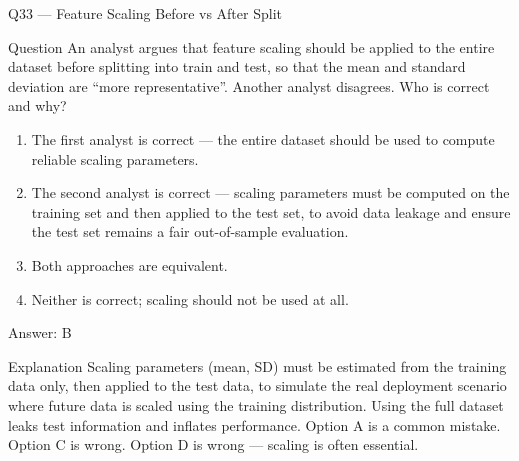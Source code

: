 \documentclass[aspectratio=169,8pt]{beamer}
\begin{document}
	\begin{frame}{Q33 --- Feature Scaling Before vs After Split}
		\begin{block}{Question}
			An analyst argues that feature scaling should be applied to the entire dataset before splitting into train and test, so that the mean and standard deviation are ``more representative''. Another analyst disagrees. Who is correct and why?
		\end{block}
		\begin{enumerate}
			\item The first analyst is correct --- the entire dataset should be used to compute reliable scaling parameters.
			\item The second analyst is correct --- scaling parameters must be computed on the training set and then applied to the test set, to avoid data leakage and ensure the test set remains a fair out-of-sample evaluation.
			\item Both approaches are equivalent.
			\item Neither is correct; scaling should not be used at all.
		\end{enumerate}
		\begin{exampleblock}{Answer: B}\end{exampleblock}
		\begin{block}{Explanation}
			Scaling parameters (mean, SD) must be estimated from the training data only, then applied to the test data, to simulate the real deployment scenario where future data is scaled using the training distribution. Using the full dataset leaks test information and inflates performance. Option A is a common mistake. Option C is wrong. Option D is wrong --- scaling is often essential.
		\end{block}
	\end{frame}
	
\end{document}
